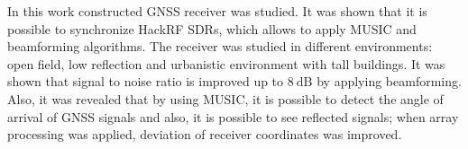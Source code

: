 \documentclass[../gnss_interference_resistant_thesis.tex]{subfiles}
\begin{document}
{In this work constructed GNSS receiver was studied. It was shown that it is possible
to synchronize HackRF SDRs, which allows to apply MUSIC and beamforming algorithms.
The receiver was studied in different environments: open field, low reflection and urbanistic environment with tall buildings.
It was shown that signal to noise ratio
is improved up to $8\ \mathrm{dB}$ by applying beamforming. Also, it was revealed that
by using MUSIC, it is possible to detect the angle of arrival of GNSS signals and also,
it is possible to see reflected signals; when array processing was applied,
deviation of receiver coordinates was improved.

}
\end{document}
